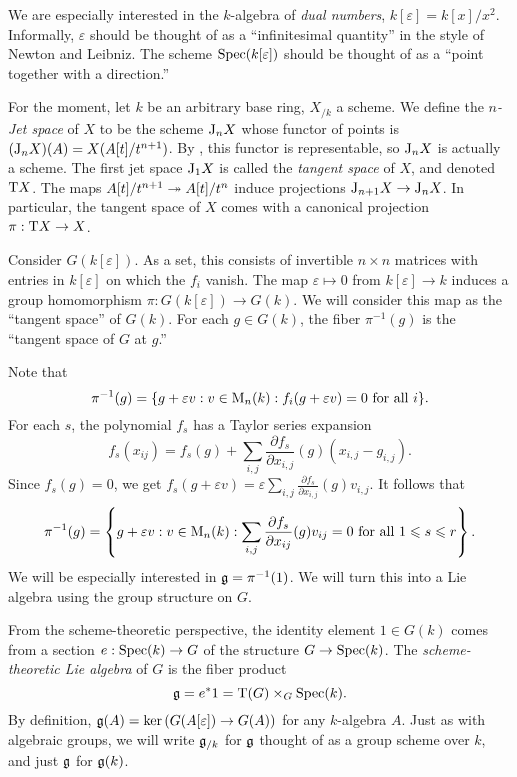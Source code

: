 We are especially interested in the $k$-algebra of \emph{dual numbers}, 
$k[\varepsilon]=k[x]/x^2$. Informally, $\varepsilon$ should be thought of as a 
``infinitesimal quantity'' in the style of Newton and Leibniz. The scheme 
$\operatorname{Spec}(k[\varepsilon])$ should be thought of as a ``point together with 
a direction.'' 

\begin{hard}
For the moment, let $k$ be an arbitrary base ring, $X_{/k}$ a scheme. We define 
the \emph{$n$-Jet space} of $X$ to be the scheme $\mathrm{J}_n X$ whose functor of 
points is $(\mathrm{J}_n X)(A) = X(A[t]/t^{n+1})$. By \cite{vojta-2007}, this 
functor is representable, so $\mathrm{J}_n X$ is actually a scheme. The first jet 
space $\mathrm{J}_1 X$ is called the \emph{tangent space} of $X$, and denoted 
$\mathrm{T} X$. The maps $A[t]/t^{n+1}\twoheadrightarrow A[t]/t^n$ induce projections 
$\mathrm{J}_{n+1} X\to \mathrm{J}_n X$. In particular, the tangent space of $X$ comes with 
a canonical projection $\pi:\mathrm{T} X\to X$. 
\end{hard}

Consider $G(k[\varepsilon])$. As a set, this consists of invertible $n\times n$ 
matrices with entries in $k[\varepsilon]$ on which the $f_i$ vanish. The map 
$\varepsilon\mapsto 0$ from $k[\varepsilon]\to k$ induces a group homomorphism 
$\pi:G(k[\varepsilon])\to G(k)$. We will consider this map as the ``tangent 
space'' of $G(k)$. For each $g\in G(k)$, the fiber 
$\pi^{-1}(g)$ is the ``tangent space of $G$ at $g$.'' 

Note that 
\[
  \pi^{-1}(g) = \{g+\varepsilon v:v\in \operatorname{M}_n(k):f_i(g+\varepsilon v)=0\text{ for all }i\} .
\]
For each $s$, the polynomial $f_s$ has a Taylor series expansion 
\[
  f_s(x_{i j}) = f_s(g) + \sum_{i,j} \frac{\partial f_s}{\partial x_{i,j}}(g) (x_{i,j}-g_{i,j}) .
\]
Since $f_s(g)=0$, we get 
$f_s(g+\varepsilon v) = \varepsilon \sum_{i,j} \frac{\partial f_s}{\partial x_{i,j}}(g) v_{i,j}$. 
It follows that 
\[
  \pi^{-1}(g) = \left\{g+\varepsilon v:v\in \operatorname{M}_n(k):\sum_{i,j} \frac{\partial f_s}{\partial x_{i j}}(g) v_{i j}=0\text{ for all }1\leqslant s\leqslant r\right\} .
\]
We will be especially interested in $\mathfrak{g}=\pi^{-1}(1)$. We will turn this into a 
Lie algebra using the group structure on $G$. 

\begin{hard}
From the scheme-theoretic perspective, the identity element $1\in G(k)$ comes 
from a section $e:\operatorname{Spec}(k)\to G$ of the structure $G\to \operatorname{Spec}(k)$. The 
\emph{scheme-theoretic Lie algebra} of $G$ is the fiber product 
\[
  \mathfrak{g} = e^\ast 1 = \mathrm{T}(G)\times_G \operatorname{Spec}(k) .
\]
By definition, $\mathfrak{g}(A)=\ker\left(G(A[\varepsilon])\to G(A)\right)$ for any 
$k$-algebra $A$. Just as with algebraic groups, we will write $\mathfrak{g}_{/k}$ for 
$\mathfrak{g}$ thought of as a group scheme 
over $k$, and just $\mathfrak{g}$ for $\mathfrak{g}(k)$. 
\end{hard}





